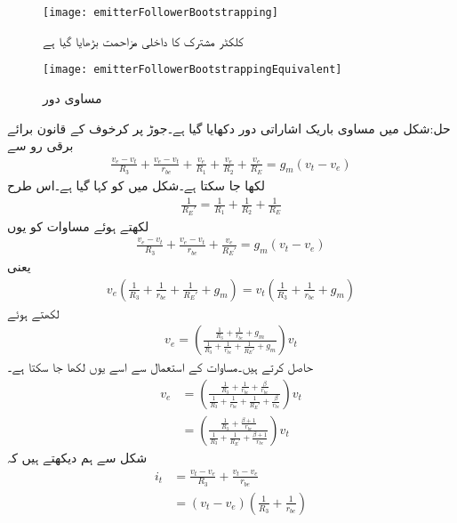 %
\begin{figure}
\centering
\texttt{[image: emitterFollowerBootstrapping]}
\caption{کلکٹر  مشترک کا داخلی مزاحمت بڑھایا گیا ہے}
\label{شکل_ٹرانزسٹر_کلکٹر _مشترک_زیادہ_داخلی_مزاحمت}
\end{figure}
%
\begin{figure}
\centering
\texttt{[image: emitterFollowerBootstrappingEquivalent]}
\caption{مساوی دور}
\label{شکل_ٹرانزسٹر_کلکٹر _مشترک_زیادہ_داخلی_مزاحمت_مساوی}
\end{figure}

حل:شکل  میں مساوی باریک اشاراتی دور دکھایا گیا ہے۔جوڑ  پر کرخوف کے قانون برائے برقی رو سے
\begin{align}\label{مساوات_ٹرانزسٹر_بوٹسٹریپ_الف}
\frac{v_e-v_t}{R_3}+\frac{v_e-v_t}{r_{be}}+\frac{v_e}{R_1}+\frac{v_e}{R_2}+\frac{v_e}{R_E}=g_m \left(v_t-v_e \right)
\end{align}
لکھا جا سکتا ہے۔شکل میں  کو  کہا گیا ہے۔اس طرح
\begin{align*}
\frac{1}{R_E'}=\frac{1}{R_1}+\frac{1}{R_2}+\frac{1}{R_E}
\end{align*}
لکھتے ہوئے مساوات  کو یوں
 \begin{align*}
\frac{v_e-v_t}{R_3}+\frac{v_e-v_t}{r_{be}}+\frac{v_e}{R_E'}=g_m \left(v_t-v_e \right)
\end{align*}
یعنی
 \begin{align*}
v_e \left(\frac{1}{R_3}+\frac{1}{r_{be}} +\frac{1}{R_E'}+g_m\right)=v_t \left(\frac{1}{R_3}+\frac{1}{r_{be}}+g_m \right)
\end{align*}
لکھتے ہوئے
\begin{align*}
v_e=\left(\frac{\frac{1}{R_3}+\frac{1}{r_{be}}+g_m}{\frac{1}{R_3}+\frac{1}{r_{be}} +\frac{1}{R_E'}+g_m}\right) v_t
\end{align*}
حاصل کرتے ہیں۔مساوات  کے استعمال سے اسے یوں لکھا جا سکتا ہے۔
\begin{align*}
v_e&=\left(\frac{\frac{1}{R_3}+\frac{1}{r_{be}}+\frac{\beta}{r_{be}}}{\frac{1}{R_3}+\frac{1}{r_{be}} +\frac{1}{R_E'}+\frac{\beta}{r_{be}}}\right) v_t\\
&=\left(\frac{\frac{1}{R_3}+\frac{\beta+1}{r_{be}}}{\frac{1}{R_3} +\frac{1}{R_E'}+\frac{\beta+1}{r_{be}}}\right) v_t
\end{align*}
شکل سے ہم دیکھتے ہیں کہ 
\begin{align*}
i_t&=\frac{v_t-v_e}{R_3}+\frac{v_t-v_e}{r_{be}}\\
&=\left(v_t-v_e \right) \left(\frac{1}{R_3}+\frac{1}{r_{be}} \right)
\end{align*}
